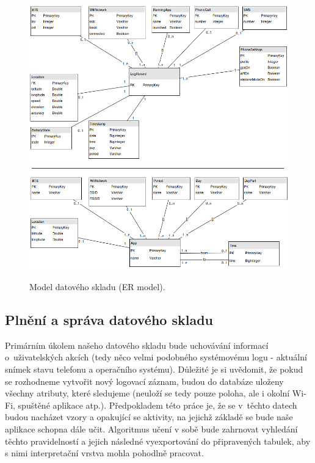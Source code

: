 \documentclass[thesis=M,czech]{FITthesis}[2012/06/26]
\begin{document}
\begin{figure}\centering
	\includegraphics[width=1\textwidth]{figures/er_model1}
	\includegraphics[width=1\textwidth]{figures/er_model2}
	\caption{Model datového skladu (ER model).}
	\label{fig:er_model}
\end{figure}

\subsection{Plnění a správa datového skladu}
Primárním úkolem našeho datového skladu bude uchovávání informací o~uživatelských akcích (tedy něco velmi podobného systémovému logu - aktuální snímek stavu telefonu a operačního systému). Důležité je si uvědomit, že pokud se rozhodneme vytvořit nový logovací záznam, budou do databáze uloženy všechny atributy, které sledujeme (neuloží se tedy pouze poloha, ale i okolní Wi-Fi, spuštěné aplikace atp.). Předpokladem této práce je, že se v~těchto datech budou nacházet vzory a opakující se aktivity, na jejichž základě se bude naše aplikace schopna dále učit. Algoritmus učení v sobě bude zahrnovat vyhledání těchto pravidelností a jejich následné vyexportování do připravených tabulek, aby s nimi interpretační vrstva mohla pohodlně pracovat.
\end{document}
